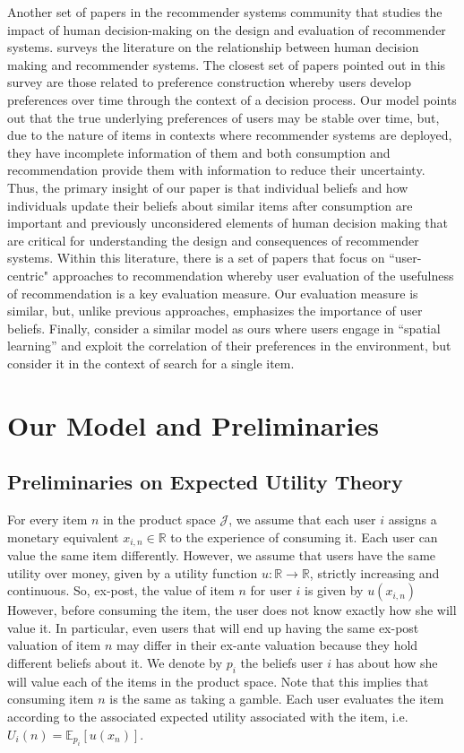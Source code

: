 \documentclass[format=acmsmall, review=false]{acmart}
\begin{document}
Another set of papers in the recommender systems community that studies the impact of human decision-making on the design and evaluation of recommender systems. \cite{chen2013human} surveys the literature on the relationship between human decision making and recommender systems. The closest set of papers pointed out in this survey are those related to preference construction \cite{bettman1998constructive, lichtenstein2006construction} whereby users develop preferences over time through the context of a decision process. Our model points out that the true underlying preferences of users may be stable over time, but, due to the nature of items in contexts where recommender systems are deployed, they have incomplete information of them and both consumption and recommendation provide them with information to reduce their uncertainty. Thus, the primary insight of our paper is that individual beliefs and how individuals update their beliefs about similar items after consumption are important and previously unconsidered elements of human decision making that are critical for understanding the design and consequences of recommender systems. Within this literature, there is a set of papers that focus on ``user-centric" approaches to recommendation \cite{celma2008new, cremonesi2013user, pu2011user} whereby user evaluation of the usefulness of recommendation is a key evaluation measure. Our evaluation measure is similar, but, unlike previous approaches, emphasizes the importance of user beliefs. Finally, \cite{hodgson2019horse} consider a similar model as ours where users engage in ``spatial learning'' and exploit the correlation of their preferences in the environment, but consider it in the context of search for a single item.

\section{Our Model and Preliminaries}
\subsection{Preliminaries on Expected Utility Theory}
\noindent For every item $n$ in the product space $\mathcal J$, we assume that each user $i$ assigns a monetary equivalent $x_{i,n} \in \mathbb R$ to the experience of consuming it. Each user can value the same item differently. However, we assume that users have the same utility over money, given by a utility function $u: \mathbb R \to \mathbb R$, strictly increasing and continuous. So, ex-post, the value of item $n$ for user $i$ is given by $u(x_{i,n})$ However, before consuming the item, the user does not know exactly how she will value it. In particular, even users that will end up having the same ex-post valuation of item $n$ may differ in their ex-ante valuation because they hold different beliefs about it. We denote by $p_{i}$ the beliefs user $i$ has about how she will value each of the items in the product space. Note that this implies that consuming item $n$ is the same as taking a gamble. Each user evaluates the item according to the associated expected utility associated with the item, i.e. $U_i(n)=\mathbb E_{p_i}[u(x_n)]$. 
\par
\end{document}
